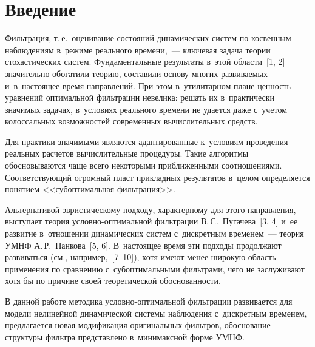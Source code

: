   
\vspace*{-4pt}



\thispagestyle{headings}

\begin{multicols}{2}

\label{st\stat}
     
     
\section{Введение}

    Фильтрация, т.\,е.\ оценивание состояний динамических систем по 
косвенным наблюдениям в~режиме реального времени,~--- ключевая задача 
теории стохастических систем. Фундаментальные результаты в~этой 
области~[1, 2] значительно обогатили теорию, составили основу многих 
развиваемых и~в~настоящее время направлений. При этом в~утилитарном 
плане ценность уравнений оптимальной фильтрации невелика: решать их 
в~практически значимых задачах, в~условиях реального времени не удается 
даже с~учетом колоссальных возможностей современных вычислительных 
средств. 

Для практики значимыми являются адаптированные к~условиям 
проведения реальных расчетов вычислительные процедуры. Такие алгоритмы\linebreak 
обосновы\-ваются чаще всего некоторыми приближенными соотношениями. 
Соответствующий огромный пласт прикладных результатов в~целом 
определяется понятием <<субоптимальная фильтрация>>. 

Альтернативой 
эвристическому подходу, характерному для этого направления, выступает 
теория услов\-но-оп\-ти\-маль\-ной фильт\-ра\-ции В.\,С.~Пугачева~[3, 4] и~ее 
развитие в~отношении динамических систем с~дискретным временем~--- 
теория   УМНФ 
А.\,Р.~Панкова~[5, 6]. В~настоящее время эти подходы продолжают 
развиваться (см., например,~[7--10]), хотя имеют менее широкую область 
применения по сравнению с~субоптимальными фильтрами, чего не 
заслуживают хотя бы по причине своей теоретической обоснованности.
    
    В данной работе методика услов\-но-оп\-ти\-мальной фильт\-ра\-ции 
развивается для модели нелинейной динамической системы наблюдения\linebreak 
с~дискретным временем, предлагается новая модификация оригинальных 
фильтров, обоснование структуры фильтра представлено в~минимаксной форме 
УМНФ.


\end{multicols}
